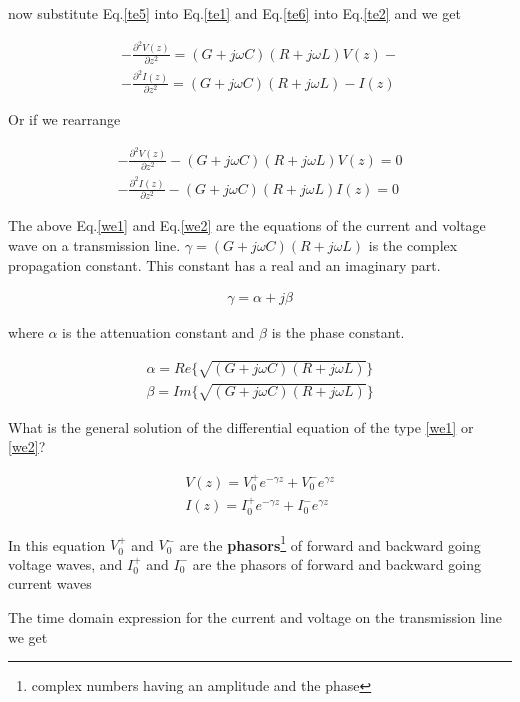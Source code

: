  now substitute  Eq.\ref{te5} into  Eq.\ref{te1}
and Eq.\ref{te6} into Eq.\ref{te2} and we get

\begin{eqnarray}
-\frac{\partial^2 V(z)}{\partial z^2}=(G+j\omega C)(R+j\omega L) V(z)
-\nonumber \\ \nonumber
-\frac{\partial^2 I(z)}{\partial z^2}= (G+j\omega C)  (R+j\omega L)
-I(z) 
\end{eqnarray}

Or if we rearrange


\begin{eqnarray}
-\frac{\partial^2 V(z)}{\partial z^2} -(G+j\omega C)(R+j\omega L)
 V(z)=0  \label{we1} \\ 
-\frac{\partial^2 I(z)}{\partial z^2}- (G+j\omega C)  (R+j\omega L)
I(z)=0 \label{we2}
\end{eqnarray}

The above Eq.\ref{we1} and Eq.\ref{we2} are the equations of the
current and voltage wave on a transmission line. $\gamma=(G+j\omega
C)(R+j\omega L)$ is the complex propagation constant. This constant
has a real and an imaginary part.

\begin{eqnarray}
\gamma= \alpha + j \beta \nonumber
\end{eqnarray}

where $\alpha$ is the attenuation constant and $\beta$ is the phase
constant.

\begin{eqnarray}
\alpha=Re\{ \sqrt{(G+j\omega C)  (R+j\omega L)  }  \} \nonumber \\ \nonumber
\beta = Im\{ \sqrt{(G+j\omega C)  (R+j\omega L)  }  \}
\end{eqnarray}

What is the general solution of the differential equation of the type
\ref{we1} or \ref{we2}?

\begin{eqnarray}
V(z)=V_0^+ e^{-\gamma z} + V_0^- e^{\gamma z} \nonumber \\ \nonumber
I(z)=I_0^+ e^{-\gamma z} + I_0^- e^{\gamma z}
\end{eqnarray}

In this equation $V_0^+$ and $V_0^-$ are the {\bf
phasors}\footnote{complex numbers having an amplitude and the phase} of forward and
backward going voltage waves, and $I_0^+$ and $I_0^-$ are the phasors of forward and
backward going current waves

The time domain expression for the current and voltage on the
transmission line we get 

